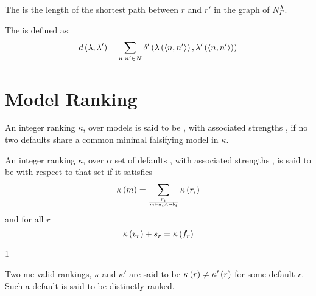 \begin{defi}
The  is the length of the shortest path between $r$ and $r'$ in the graph of $N_{\Gamma}^X$.
\cite{conf/ijcai/EuzenatLD03}
\end{defi}

\begin{defi}
The  is defined as:
\begin{equation}
d\left(\lambda,\lambda'\right)=\displaystyle\sum_{n,n'\in N}\delta'\left(\lambda\left(\left\langle n,n'\right\rangle\right),\lambda'\left(\left\langle n,n'\right\rangle\right)\right)
\end{equation}
\cite{conf/ijcai/EuzenatLD03}
\end{defi}

\section{Model Ranking}

\begin{defi}
An integer ranking $\kappa$, over models is said to be  , with associated strengths , if no two defaults share a common minimal falsifying model in $\kappa$.
\cite{conf/ijcai/BourneP99}
\end{defi}

\begin{defi}
An integer ranking $\kappa$, over $\alpha$ set of defaults , with associated strengths , is said to be  with respect to that set if it satisfies
\begin{equation}
\kappa\left(m\right)=\displaystyle\sum_{\frac{r_i}{m\vDash a_i\wedge\neg b_i}}{\kappa\left(r_i\right)}
\end{equation}
and for all $r$
\begin{equation}
\kappa\left(v_r\right)+s_r=\kappa\left(f_r\right)
\end{equation}
\cite{conf/ijcai/BourneP99}
\end{defi}

1\begin{defi}
Two me-valid rankings, $\kappa$ and $\kappa'$ are said to be  \iffTx{} $\kappa\left(r\right)\neq\kappa'\left(r\right)$ for some default $r$. Such a default is said to be distinctly ranked.
\cite{conf/ijcai/BourneP99}
\end{defi}